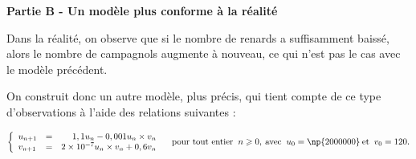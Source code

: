 \documentclass[10pt,a4paper]{article}
\begin{document}
\bigskip

\textbf{Partie B - Un modèle plus conforme à la réalité}

\medskip

Dans la réalité, on observe que si le nombre de renards a suffisamment baissé, alors le nombre de
campagnols augmente à nouveau, ce qui n'est pas le cas avec le modèle précédent. 

On construit donc un autre modèle, plus précis, qui tient compte de ce type d'observations à l'aide des relations suivantes :

\[\left\{\begin{array}{l c r}
u_{n+1} &=& 1,1u_n - 0,001u_n \times v_n\\
v_{n+1} &=& 2 \times 10^{-7} u_n \times v_n + 0,6v_n
\end{array}\right.\quad \text{pour tout entier }\:n \geqslant 0,\: \text{avec }\:u_0 = \np{2000000}\: \text{et }\: v_0 = 120.\]

\medskip
\end{document}
